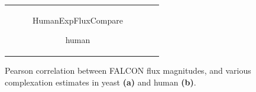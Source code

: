 \documentclass[compress,red,notes]{beamer}
\begin{document}
{\begin{figure}
\begin{tabular}{cc}
\begin{subfigure}[b]{0.5\textwidth}
    {HumanExpFluxCompare}
  \caption{human} \label{fig:FluxExpCmp:B}
  \end{subfigure}
\\
\end{tabular}
\caption{Pearson correlation between FALCON flux magnitudes, and
various complexation estimates in yeast \textbf{(a)} and human
\textbf{(b)}.}
\label{fig:FluxExpCmp}
\end{figure}
}


\end{document}

